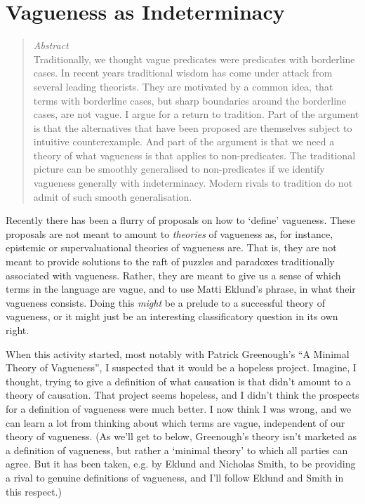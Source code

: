 


%
%
%
%
%
%
%
%
%
%
\chapter{Vagueness as Indeterminacy}


\begin{quote}

{\itshape Abstract} \\
Traditionally, we thought vague predicates were predicates with borderline cases. In recent years traditional wisdom has come under attack from several leading theorists. They are motivated by a common idea, that terms with borderline cases, but sharp boundaries around the borderline cases, are not vague. I argue for a return to tradition. Part of the argument is that the alternatives that have been proposed are themselves subject to intuitive counterexample. And part of the argument is that we need a theory of what vagueness is that applies to non-predicates. The traditional picture can be smoothly generalised to non-predicates if we identify vagueness generally with indeterminacy. Modern rivals to tradition do not admit of such smooth generalisation.
\end{quote}

\noindent Recently there has been a flurry of proposals on how to `define' vagueness. These proposals are not meant to amount to \textit{theories} of vagueness as, for instance, epistemic or supervaluational theories of vagueness are. That is, they are not meant to provide solutions to the raft of puzzles and paradoxes traditionally associated with vagueness. Rather, they are meant to give us a sense of which terms in the language are vague, and to use Matti Eklund's phrase, in what their vagueness consists. Doing this \textit{might} be a prelude to a successful theory of vagueness, or it might just be an interesting classificatory question in its own right.

When this activity started, most notably with Patrick Greenough's ``A Minimal Theory of Vagueness'', I suspected that it would be a hopeless project. Imagine, I thought, trying to give a definition of what causation is that didn't amount to a theory of causation. That project seems hopeless, and I didn't think the prospects for a definition of vagueness were much better. I now think I was wrong, and we can learn a lot from thinking about which terms are vague, independent of our theory of vagueness. (As we'll get to below, Greenough's theory isn't marketed as a definition of vagueness, but rather a `minimal theory' to which all parties can agree. But it has been taken, e.g. by Eklund and Nicholas Smith, to be providing a rival to genuine definitions of vagueness, and I'll follow Eklund and Smith in this respect.)


